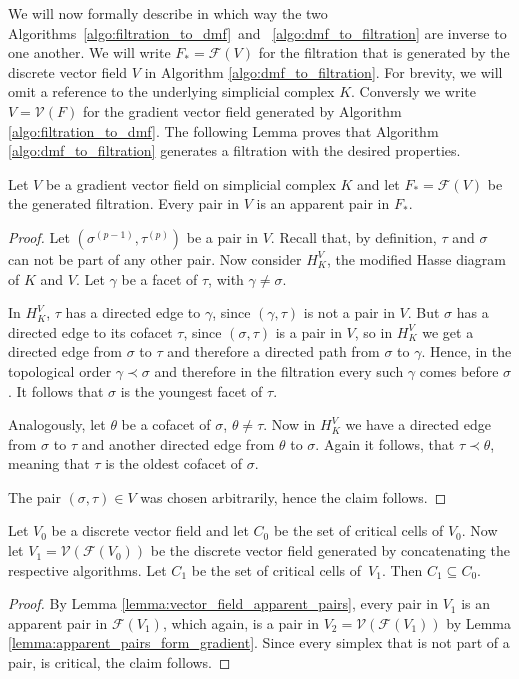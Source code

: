 We will now formally describe in which way the two Algorithms~\ref{algo:filtration_to_dmf}~and~ \ref{algo:dmf_to_filtration} are inverse to one another. We will write $F_* = \mathcal{F}(V)$ for the filtration that is generated by the discrete vector field $V$ in Algorithm \ref{algo:dmf_to_filtration}. For brevity, we will omit a reference to the underlying simplicial complex $K$. Conversly we write $V = \mathcal{V}(F)$ for the gradient vector field generated by Algorithm \ref{algo:filtration_to_dmf}.
The following Lemma proves that Algorithm \ref{algo:dmf_to_filtration} generates a filtration with the desired properties. 

\begin{lemma}
Let $V$ be a gradient vector field on simplicial complex $K$ and let $F_* = \mathcal{F}(V)$ be the generated filtration. Every pair in $V$ is an apparent pair in $F_*$. 
\label{lemma:vector_field_apparent_pairs}
\end{lemma}
\begin{proof}
Let $(\sigma^{(p-1)},\tau^{(p)})$ be a pair in $V$. Recall that, by definition, $\tau$ and $\sigma$ can not be part of any other pair. Now consider $H_K^V$, the modified Hasse diagram of $K$ and $V$. Let $\gamma$ be a facet of $\tau$, with $\gamma \neq \sigma$.

In $H_K^V$, $\tau$ has a directed edge to $\gamma$, since $(\gamma,\tau)$ is not a pair in $V$. But $\sigma$ has a directed edge to its cofacet $\tau$, since $(\sigma,\tau)$ is a pair in $V$, so in $H_K^V$ we get a directed edge from $\sigma$ to $\tau$ and therefore a directed path from $\sigma$ to $\gamma$. Hence, in the topological order $\gamma \prec \sigma$ and therefore in the filtration every such $\gamma$ comes before $\sigma$. It follows that $\sigma$ is the youngest facet of $\tau$. 

Analogously, let $\theta$ be a cofacet of $\sigma$, $\theta \neq \tau$. Now in $H_K^V$ we have a directed edge from $\sigma$ to  $\tau$ and another directed edge from $\theta$ to $\sigma$. Again it follows, that $\tau \prec \theta$, meaning that $\tau$ is the oldest cofacet of $\sigma$. 

The pair $(\sigma,\tau) \in V$ was chosen arbitrarily, hence the claim follows. 
\end{proof}

\begin{lemma}
Let $V_0$ be a discrete vector field and let $C_0$ be the set of critical cells of $V_0$. Now let $V_1 = \mathcal{V}(\mathcal{F}(V_0))$ be the discrete vector field generated by concatenating the respective algorithms. Let $C_1$ be the set of critical cells of~$V_1$. Then $C_1 \subseteq C_0$.
\label{lemma:inclusion_of_critical_sets}
\end{lemma}
\begin{proof}
By Lemma \ref{lemma:vector_field_apparent_pairs}, every pair in $V_1$ is an apparent pair in $\mathcal{F}(V_1)$, which again, is a pair in $ V_2 = \mathcal{V}(\mathcal{F}(V_1))$ by Lemma \ref{lemma:apparent_pairs_form_gradient}. Since every simplex that is not part of a pair, is critical, the claim follows. 
\end{proof}

